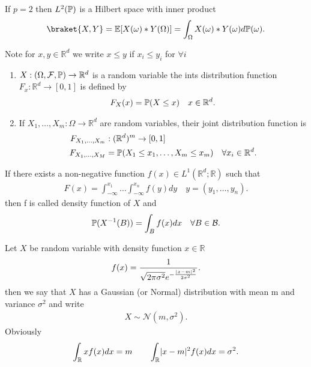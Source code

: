 \begin{remark}
 If $p=2$ then $L^{2}(\P) $ is a Hilbert space with inner product 
 \begin{align*}
   \braket{X,Y} = \E[X(\omega )*Y(\Omega )] = \int_{\Omega }X(\omega )*Y(\omega )d\P(\omega )
 .\end{align*}
\end{remark}
\begin{definition}
 Note for $x,y \in  \mathbb{R}^{d} $  we write $x\le y$ if $x_i \le  y_i$ for $\forall i$
 \begin{enumerate}
   \item $X: (\Omega ,\mathcal{F},\P) \to \mathbb{R}^{d} $ is a random variable the ints distribution function $F_x : \mathbb{R}^{d} \to [0,1] $
     is defined by 
     \begin{align*}
      F_X(x) = \P(X\le x) \quad x \in  \mathbb{R}^{d} 
     .\end{align*}
    \item If $X_{1},\ldots ,X_m : \Omega \to \mathbb{R}^{d} $ are random variables, their joint distribution function is
      \begin{align*}
        F_{X_{1},\ldots ,X_m} &: (\mathbb{R}^{d} )^m \to [0,1]\\
        F_{X_{1},\ldots ,X_M} &= \P(X_{1}\le x_{1},\ldots ,X_m\le x_m) \quad \forall x_i \in \mathbb{R}^{d} 
      .\end{align*}
 \end{enumerate}
\end{definition}
\begin{definition}
 If there exists a non-negative function $f(x) \in  L^{1}(\mathbb{R}^{d} ; \mathbb{R} ) $   such that 
 \begin{align*}
   F(x) = \int_{-\infty}^{x_{1}}  \ldots \int_{-\infty}^{x_n} f(y) dy \quad y = (y_{1},\ldots ,y_n)
 .\end{align*}
 then f is called density function of $X$ and 
 \begin{align*}
  \P(X^{-1}(B) ) = \int_B f(x) dx \quad \forall  B \in  \mathcal{B}
 .\end{align*}
\end{definition}
\begin{example}
 Let $X$ be random variable with density function  $x \in  \mathbb{R}$
 \begin{align*}
  f(x) = \frac{1}{\sqrt{2\pi \sigma ^2}e^{-\frac{\abs{x-m}^2}{2\sigma ^2}}  }
 .\end{align*}
 then we say that $X$ has a Gaussian (or Normal) distribution with mean m and variance $\sigma^2$ and write
 \begin{align*}
  X \sim \mathcal{N}(m,\sigma^2)
 .\end{align*}
 Obviously 
 \begin{align*}
   \int_{\mathbb{R}} xf(x) dx = m \qquad \int_{\mathbb{R}}\abs{x-m}^2f(x) dx = \sigma^2
  .\end{align*}
\end{example}
